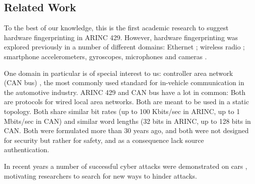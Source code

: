 \documentclass[conference]{IEEEtran}
\begin{document}

\subsection{Related Work} \label{RelatedWork}
  To the best of our knowledge, this is the first academic research to suggest hardware fingerprinting in ARINC 429. However, hardware fingerprinting was explored previously in a number of different domains: Ethernet \cite{kohno2005remote, uluagac2013passive, gerdes2012physical}; wireless radio \cite{ellis2001characteristics, brik2008wireless, xu2015device}; smartphone accelerometers, gyroscopes, microphones and cameras \cite{dey2014accelprint, das2016tracking}.
  
  One domain in particular is of special interest to us: controller area network (CAN bus) \cite{bosch1991canbus}, the most commonly used standard for in-vehicle communication in the automotive industry. ARINC 429 and CAN bus have a lot in common: Both are protocols for wired local area networks. Both are meant to be used in a static topology. Both share similar bit rates (up to 100 Kbits/sec in ARINC, up to 1 Mbits/sec in CAN) and similar word lengths (32 bits in ARINC, up to 128 bits in CAN. Both were formulated more than 30 years ago, and both were not designed for security but rather for safety, and as a consequence lack source authentication.
  
  In recent years a number of successful cyber attacks were demonstrated on cars \cite{miller2015remote}, motivating researchers to search for new ways to hinder attacks.
  
\end{document}
